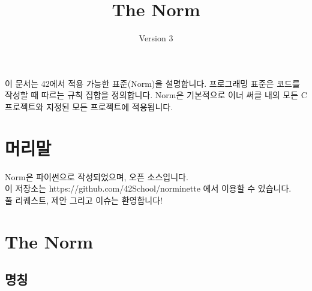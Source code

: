 \documentclass{42-ko}
\begin{document}
\title{The Norm}
\subtitle{Version 3}

\summary
{
    이 문서는 42에서 적용 가능한 표준(Norm)을 설명합니다. 프로그래밍 표준은 
    코드를 작성할 때 따르는 규칙 집합을 정의합니다. Norm은 기본적으로 이너 써클 
    내의 모든 C 프로젝트와 지정된 모든 프로젝트에 적용됩니다.
}

\maketitle

\tableofcontents



\chapter{머리말}

    Norm은 파이썬으로 작성되었으며, 오픈 소스입니다. \\
    이 저장소는 https://github.com/42School/norminette 에서 이용할 수 있습니다.\\
    풀 리퀘스트, 제안 그리고 이슈는 환영합니다!

\chapter{The Norm}


    \section{명칭}
\end{document}
